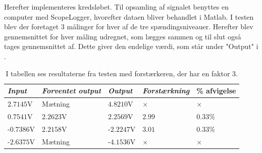 \noindent Herefter implementeres kredsløbet. Til opsamling af signalet benyttes en computer med ScopeLogger, hvorefter dataen bliver behandlet i Matlab. I testen blev der foretaget 3 målinger for hver af de tre spændingsniveauer. Herefter blev gennemsnittet for hver måling udregnet, som lægges sammen og til slut også tages gennemsnittet af. Dette giver den endelige værdi, som står under "Output" i .\

\begin{table}[H]
	\centering
	\begin{tabular}{|l|l|l|l|l|}
		\hline
 \textit{Input} & \textit{Forventet output} & \textit{Output}  &  \textit{Forstærkning}  & \% afvigelse \\ \hline
 $2.7145$V            & Mætning              & $4.8210$V       &    $\times$             & $\times$  \\ \hline
 $0.7541$V            & $2.2623$V            & $2.2569$V       &    $2.99$               & $0.33\%$     \\ \hline
-$0.7386$V           & $2.2158$V            & -$2.2247$V       &    $3.01$               & $0.33\%$     \\ \hline
-$2.6375$V           & Mætning              & -$4.1536$V       &    $\times$             & $\times$    \\ \hline
	\end{tabular}
	\caption{I tabellen ses resultaterne fra testen med forstærkeren, der har en faktor 3.}
	\label{Tab:faktor3_test}
\end{table}

